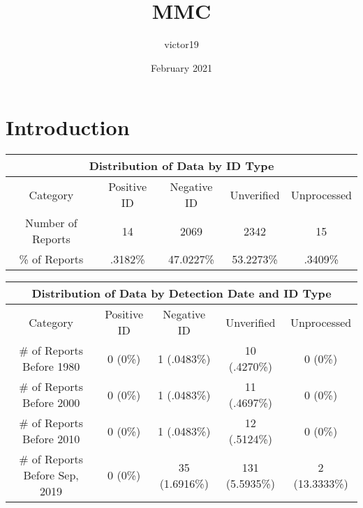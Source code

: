 \documentclass{article}
\title{MMC}
\author{victor19 }
\date{February 2021}
\begin{document}
\maketitle

\section{Introduction}



\begin{center}
 \begin{tabular}{||c c c c c||} 
 \hline
 \multicolumn{5}{|c|}{Distribution of Data by ID Type} \\
 \hline
 Category & Positive ID & Negative ID & Unverified & Unprocessed  \\ [0.5ex] 
 \hline
 Number of Reports & 14 & 2069 & 2342 & 15 \\ 
 \hline
\% of Reports & .3182\% & 47.0227\% & 53.2273\% & .3409\% \\

 \hline
\end{tabular}
\end{center}


\begin{center}
 \begin{tabular}{||c c c c c||} 
 \hline
 \multicolumn{5}{|c|}{Distribution of Data by Detection Date and ID Type} \\
 \hline
 Category & Positive ID & Negative ID & Unverified & Unprocessed  \\ [0.5ex] 
 \hline
 \# of Reports Before 1980 & 0 (0\%) & 1 (.0483\%) & 10 (.4270\%) & 0 (0\%) \\ 
 \hline
\# of Reports Before 2000 & 0 (0\%) & 1 (.0483\%) & 11 (.4697\%) & 0 (0\%) \\
\hline
\# of Reports Before 2010 & 0 (0\%) & 1 (.0483\%) & 12 (.5124\%) & 0 (0\%) \\
\hline
\# of Reports Before Sep, 2019 & 0 (0\%) & 35 (1.6916\%) & 131 (5.5935\%) & 2 (13.3333\%) \\
\hline
\end{tabular}
\end{center}
\end{document}
